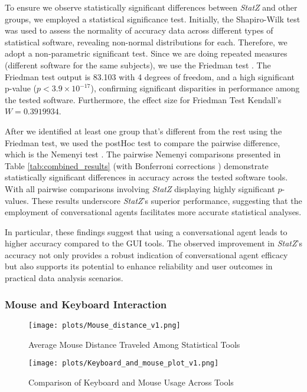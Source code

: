\documentclass{article}
\begin{document}
To ensure we observe statistically significant differences between \textit{StatZ} and other groups, we employed a statistical significance test. Initially, the Shapiro-Wilk test \cite{Shapiro1965}  was used to assess the normality of accuracy data across different types of statistical software, revealing non-normal distributions for each. Therefore, we adopt a non-parametric significant test. Since we are doing repeated measures (different software for the same subjects), we use the Friedman test \cite{Friedman1937}. The Friedman test output is 83.103 with 4 degrees of freedom, and a high significant p-value (\( p < 3.9 \times 10^{-17} \)), confirming significant disparities in performance among the tested software. Furthermore, the effect size for Friedman Test Kendall's $W = 0.3919934$. 

After we identified at least one group that's different from the rest using the Friedman test, we used the postHoc test to compare the pairwise difference, which is the Nemenyi test \cite{nemenyi1963}. The pairwise Nemenyi comparisons presented in Table \ref{tab:combined_results} (with Bonferroni corrections \cite{Bonferroni1936}) demonstrate statistically significant differences in accuracy across the tested software tools. With all pairwise comparisons involving \textit{StatZ} displaying highly significant \(p\)-values. These results underscore \textit{StatZ}'s superior performance, suggesting that the employment of conversational agents facilitates more accurate statistical analyses. 

In particular, these findings suggest that using a conversational agent leads to higher accuracy compared to the GUI tools. The observed improvement in \textit{StatZ}'s accuracy not only provides a robust indication of conversational agent efficacy but also supports its potential to enhance reliability and user outcomes in practical data analysis scenarios.

\subsubsection{ Mouse and Keyboard Interaction}
\begin{figure}[htb]
  \centering
  \begin{minipage}{0.48\textwidth}
    \centering
    \texttt{[image: plots/Mouse\_distance\_v1.png]}
    \caption{Average Mouse Distance Traveled Among Statistical Tools}
    \label{fig:mouse_distance_plot}
  \end{minipage}
  \hfill
  \begin{minipage}{0.48\textwidth}
    \centering
    \texttt{[image: plots/Keyboard\_and\_mouse\_plot\_v1.png]}
    \caption{Comparison of Keyboard and Mouse Usage Across Tools}
    \label{fig:keyboard_mouse_plot}
  \end{minipage}
\end{figure}
\end{document}
